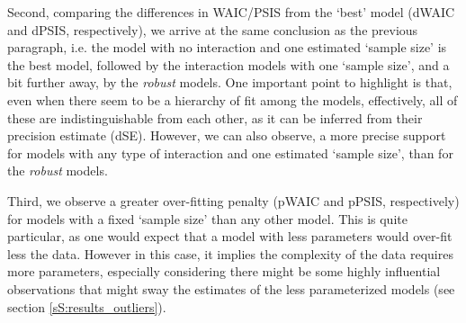 Second, comparing the differences in WAIC/PSIS from the `best' model (dWAIC and dPSIS, respectively), we arrive at the same conclusion as the previous paragraph, i.e. the model with no interaction and one estimated `sample size' is the best model, followed by the interaction models with one `sample size', and a bit further away, by the \textit{robust} models. One important point to highlight is that, even when there seem to be a hierarchy of fit among the models, effectively, all of these are indistinguishable from each other, as it can be inferred from their precision estimate (dSE). However, we can also observe, a more precise support for models with any type of interaction and one estimated `sample size', than for the \textit{robust} models.

Third, we observe a greater over-fitting penalty (pWAIC and pPSIS, respectively) for models with a fixed `sample size' than any other model. This is quite particular, as one would expect that a model with less parameters would over-fit less the data. However in this case, it implies the complexity of the data requires more parameters, especially considering there might be some highly influential observations that might sway the estimates of the less parameterized models (see section \ref{sS:results_outliers}). 
%
